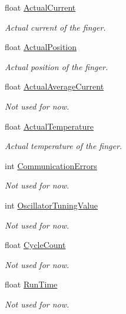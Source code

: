 \begin{DoxyCompactItemize}
float \hyperlink{struct_finger_ae1928102462f537b1392ca61d002c0bd}{Actual\+Current}
\begin{DoxyCompactList}\small\item\em Actual current of the finger. \end{DoxyCompactList}\item 
float \hyperlink{struct_finger_a6a8082bb2dc6e4b1a809c351c2002a9d}{Actual\+Position}
\begin{DoxyCompactList}\small\item\em Actual position of the finger. \end{DoxyCompactList}\item 
float \hyperlink{struct_finger_abe8eb2782ebe64bacd24b5283d6bb64f}{Actual\+Average\+Current}
\begin{DoxyCompactList}\small\item\em Not used for now. \end{DoxyCompactList}\item 
float \hyperlink{struct_finger_a7e85083e7ee6aaf7f8ac0fcbf0b4ced8}{Actual\+Temperature}
\begin{DoxyCompactList}\small\item\em Actual temperature of the finger. \end{DoxyCompactList}\item 
int \hyperlink{struct_finger_a688ac73326f0d7e071bb3755ff3f6a02}{Communication\+Errors}
\begin{DoxyCompactList}\small\item\em Not used for now. \end{DoxyCompactList}\item 
int \hyperlink{struct_finger_ae77cb437b8a3225ec7012645df40aa48}{Oscillator\+Tuning\+Value}
\begin{DoxyCompactList}\small\item\em Not used for now. \end{DoxyCompactList}\item 
float \hyperlink{struct_finger_a52eadd12c593a5fd5cc554a11619bc5d}{Cycle\+Count}
\begin{DoxyCompactList}\small\item\em Not used for now. \end{DoxyCompactList}\item 
float \hyperlink{struct_finger_a28ad3ba61112ad6b05532edb89427684}{Run\+Time}
\begin{DoxyCompactList}\small\item\em Not used for now. \end{DoxyCompactList}\item 

\end{DoxyCompactItemize}
